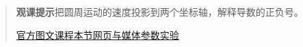 \begin{quote}\small\textbf{观课提示}\quad 把圆周运动的速度投影到两个坐标轴，解释导数的正负号。

\href{https://www.3blue1brown.com/lessons/derivatives-trig-functions/}{官方图文课程}\quad\href{https://vitael04213.github.io/3blue1brown-notes/lessons/derivatives-trig-functions.html}{本节网页与媒体}\quad\href{https://vitael04213.github.io/3blue1brown-notes/lab.html\#complex}{参数实验}
\end{quote}
